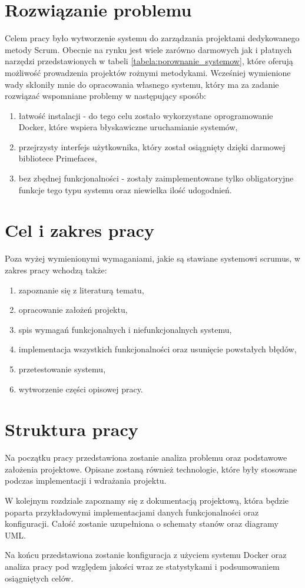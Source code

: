 \section{Rozwiązanie problemu}

Celem pracy było wytworzenie systemu do zarządzania projektami dedykowanego metody Scrum. Obecnie na rynku jest wiele zarówno darmowych jak i płatnych narzędzi przedstawionych w tabeli \ref{tabela:porownanie_systemow}, które oferują możliwość prowadzenia projektów rożnymi metodykami. Wcześniej wymienione wady skłoniły mnie do opracowania własnego systemu, który ma za zadanie rozwiązać wspomniane problemy w następujący sposób:
\begin{enumerate}
	\item łatwość instalacji - do tego celu zostało wykorzystane oprogramowanie Docker, które wspiera błyskawiczne uruchamianie systemów,
	\item przejrzysty interfejs użytkownika, który został osiągnięty dzięki darmowej bibliotece Primefaces,
	\item bez zbędnej funkcjonalności - zostały zaimplementowane tylko obligatoryjne funkcje tego typu systemu oraz niewielka ilość udogodnień.
\end{enumerate}

\section{Cel i zakres pracy}
Poza wyżej wymienionymi wymaganiami, jakie są stawiane systemowi scrumus, w zakres pracy wchodzą także:
\begin{enumerate}
	\item zapoznanie się z literaturą tematu,
	\item opracowanie założeń projektu,
	\item spis wymagań funkcjonalnych i niefunkcjonalnych systemu,
	\item implementacja wszystkich funkcjonalności oraz usunięcie powstałych błędów,
	\item przetestowanie systemu,
	\item wytworzenie części opisowej pracy.
	
\end{enumerate}


\section{Struktura pracy}
Na początku pracy przedstawiona zostanie analiza problemu oraz podstawowe założenia projektowe. Opisane zostaną również technologie, które były stosowane podczas implementacji i wdrażania projektu. 

W kolejnym rozdziale zapoznamy się z dokumentacją projektową, która będzie poparta przykładowymi implementacjami danych funkcjonalności oraz konfiguracji. Całość zostanie uzupełniona o schematy stanów oraz diagramy UML. 

Na końcu przedstawiona zostanie konfiguracja z użyciem systemu Docker oraz analiza pracy pod względem jakości wraz ze statystykami i podsumowaniem osiągniętych celów.